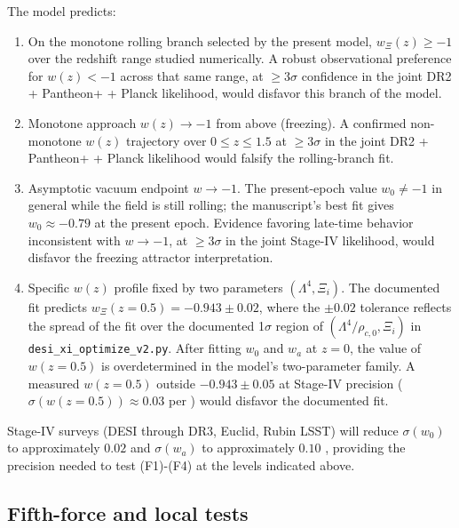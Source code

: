 \documentclass[11pt,reqno]{amsart}
\theoremstyle{plain}
\theoremstyle{definition}
\theoremstyle{remark}
\begin{document}
The model predicts:
\begin{enumerate}
  \item[(F1)] On the monotone rolling branch selected by the present
        model, $w_\Xi(z) \geq -1$ over the redshift range studied
        numerically. A robust observational preference for $w(z) < -1$
        across that same range, at $\geq 3\sigma$ confidence in the joint
        DR2 + Pantheon+ + Planck likelihood, would disfavor this branch
        of the model.
  \item[(F2)] Monotone approach $w(z) \to -1$ from above (freezing). A
        confirmed non-monotone $w(z)$ trajectory over $0 \leq z \leq 1.5$
        at $\geq 3\sigma$ in the joint DR2 + Pantheon+ + Planck likelihood
        would falsify the rolling-branch fit.
  \item[(F3)] Asymptotic vacuum endpoint $w \to -1$. The present-epoch
        value $w_0 \neq -1$ in general while the field is still rolling;
        the manuscript's best fit gives $w_0 \approx -0.79$ at the present
        epoch. Evidence favoring late-time behavior inconsistent with
        $w \to -1$, at $\geq 3\sigma$ in the joint Stage-IV likelihood,
        would disfavor the freezing attractor interpretation.
  \item[(F4)] Specific $w(z)$ profile fixed by two parameters
        $(\Lambda^{4}, \Xi_i)$. The documented fit predicts
        $w_\Xi(z = 0.5) = -0.943 \pm 0.02$, where the
        $\pm 0.02$ tolerance reflects the spread of the fit over the
        documented 1$\sigma$ region of $(\Lambda^{4}/\rho_{c,0}, \Xi_i)$
        in \texttt{desi\_xi\_optimize\_v2.py}. After fitting $w_0$ and
        $w_a$ at $z = 0$, the value of $w(z = 0.5)$ is overdetermined
        in the model's two-parameter family. A measured
        $w(z = 0.5)$ outside $-0.943 \pm 0.05$ at Stage-IV precision
        ($\sigma(w(z = 0.5)) \approx 0.03$ per
        \cite{ShajibFrieman2025}) would disfavor the documented fit.
\end{enumerate}
Stage-IV surveys (DESI through DR3, Euclid, Rubin LSST) will reduce
$\sigma(w_0)$ to approximately $0.02$ and $\sigma(w_a)$ to approximately
$0.10$ \cite{ShajibFrieman2025,Turyshev2026Review}, providing the
precision needed to test (F1)-(F4) at the levels indicated above.

\subsection{Fifth-force and local tests}
\end{document}
